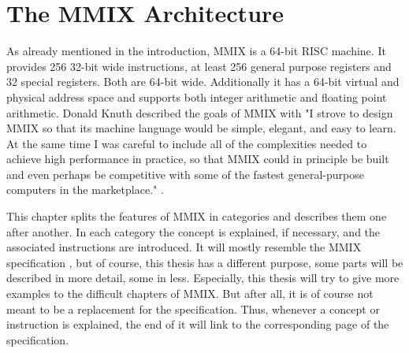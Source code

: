 \chapter{The MMIX Architecture}
\label{ch:mmix-arch}

As already mentioned in the introduction, MMIX is a 64-bit  \gls{RISC} machine. It provides 256 32-bit wide instructions, at least 256 general purpose registers and 32 special registers. Both are 64-bit wide. Additionally it has a 64-bit virtual and physical address space and supports both integer arithmetic and floating point arithmetic. \gls{Donald Knuth} described the goals of MMIX with "I strove to design MMIX so that its machine language would be simple, elegant, and easy to learn. At the same time I was careful to include all of the complexities needed to achieve high performance in practice, so that MMIX could in principle be built and even perhaps be competitive with some of the fastest general-purpose computers in the marketplace." \citep[pg. v]{mmix-ware-book}.

This chapter splits the features of MMIX in categories and describes them one after another. In each category the concept is explained, if necessary, and the associated instructions are introduced. It will mostly resemble the MMIX specification \citep{mmix-doc}, but of course, this thesis has a different purpose, \ie some parts will be described in more detail, some in less. Especially, this thesis will try to give more examples to the difficult chapters of MMIX. But after all, it is of course not meant to be a replacement for the specification. Thus, whenever a concept or instruction is explained, the end of it will link to the corresponding page of the specification.












